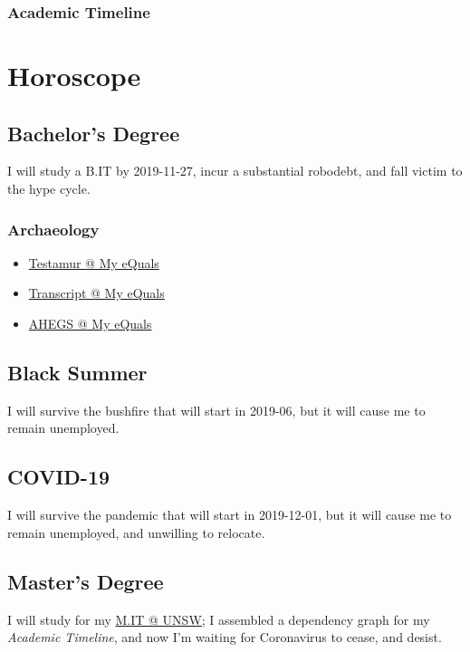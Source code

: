 \documentclass[12pt,a4paper,oneside]{article}
\newcommand{\sh}[1]{{\color{gray}{#1}}}
\begin{document}
\subsubsection{Academic Timeline}


\newpage
\section{Horoscope}
\subsection{Bachelor's Degree}
I will study a B.IT by 2019-11-27, incur a substantial robodebt, and fall victim to the hype cycle.%
\subsubsection{Archaeology}
\label{sec:bit}
\begin{itemize}
   \item \href{https://www.myequals.net/sharelink/59c13052-b705-429f-ab7d-3d51068ba373/0cf60853-fd40-4c56-8542-9b9ebdd5f9df}{Testamur @ My eQuals}
   \item \href{https://www.myequals.net/sharelink/ac919374-f10e-4434-a549-834e7449e091/33ccb930-5a20-4213-925a-8b46a811dedf}{Transcript @ My eQuals}
   \item \href{https://www.myequals.net/sharelink/26d57439-7038-416b-ad68-5432e12ee575/db9b5326-c213-4ab1-97c3-e899bc731e5f}{AHEGS @ My eQuals}
\end{itemize}
\subsection{Black Summer}
I will survive the bushfire that will start in 2019-06, but it will cause me to remain unemployed.
\subsection{COVID-19}
I will survive the pandemic that will start in 2019-12-01, but it will cause me to remain unemployed, and unwilling to relocate.
\subsection{Master's Degree}
\noindent{}I will study for my \href{https://www.handbook.unsw.edu.au/postgraduate/specialisations/2021/COMPAS}{M.IT @ UNSW}; I assembled a dependency graph for my \textit{Academic Timeline}, and now I'm waiting for Coronavirus to cease, and desist.%
\end{document}
